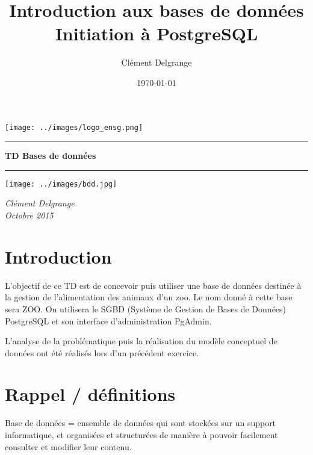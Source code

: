 \documentclass[11pt]{article}
\title{Introduction aux bases de données\\Initiation à PostgreSQL}
\author{Clément Delgrange}
\date{\today}
\begin{document}
	\pagestyle{fancy}
	\fancyhf{}
	\renewcommand{\headrulewidth}{0pt}
	\fancyfoot[C]{-\thepage-}
	\renewcommand{\footrulewidth}{0.5pt}

	

	\begin{titlepage}
		\begin{sffamily}
			\begin{flushleft}
				\texttt{[image: ../images/logo\_ensg.png]}\\[1.5cm]
			\end{flushleft}
			\begin{flushright}
			\end{flushright}
			
			\begin{center}
				\hrule
					\vspace{0.5cm}
					{\LARGE \bfseries TD Bases de données}
					\vspace{0.7cm}
				\hrule
				
				\vspace{3cm}
				\texttt{[image: ../images/bdd.jpg]}
				\vspace{3.5cm}
			
				\large \textit{Clément Delgrange\\
				Octobre 2015}
			\end{center}
		\end{sffamily}
	\end{titlepage}
	
	
	
	\section*{Introduction}
	\label{sec:Introduction}
		L'objectif de ce TD est de concevoir puis utiliser une base de données destinée à la gestion de l'alimentation des animaux d'un zoo. Le nom donné à cette base sera ZOO. On utilisera le SGBD (Système de Gestion de Bases de Données) PostgreSQL et son interface d'administration PgAdmin.
	
		L'analyse de la problématique puis la réalisation du modèle conceptuel de données ont été réalisés lors d'un précédent exercice. 
	
	
	\section{Rappel / définitions}
	Base de données = ensemble de données qui sont stockées sur un support informatique, et organisées et structurées de manière à pouvoir facilement consulter et modifier leur contenu.
	
\end{document}
